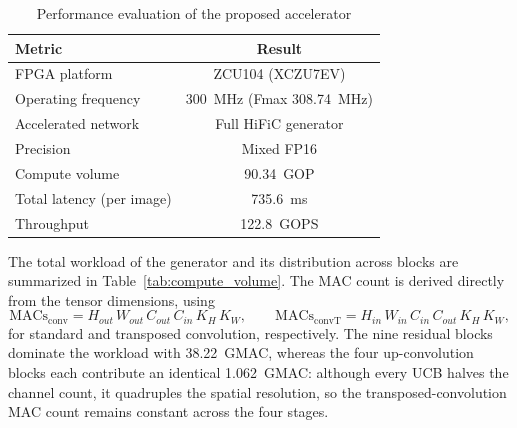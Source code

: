 \begin{table}[H]
    \centering
    \caption{Performance evaluation of the proposed accelerator}
    \label{tab:performance_evaluation}
    \begin{tabular}{|l|c|}
        \hline
        \textbf{Metric} & \textbf{Result} \\
        \hline
        FPGA platform & ZCU104 (XCZU7EV) \\
        \hline
        Operating frequency & 300~MHz (Fmax 308.74~MHz) \\
        \hline
        Accelerated network & Full HiFiC generator \\
        \hline
        Precision & Mixed FP16 \\
        \hline
        Compute volume & 90.34~GOP \\
        \hline
        Total latency (per image) & 735.6~ms \\
        \hline
        Throughput & 122.8~GOPS \\
        \hline
    \end{tabular}
\end{table}

The total workload of the generator and its distribution across blocks are summarized in Table~\ref{tab:compute_volume}. The MAC count is derived directly from the tensor dimensions, using
\[
\text{MACs}_{\text{conv}} = H_{out}\,W_{out}\,C_{out}\,C_{in}\,K_H\,K_W,
\qquad
\text{MACs}_{\text{convT}} = H_{in}\,W_{in}\,C_{in}\,C_{out}\,K_H\,K_W,
\]
for standard and transposed convolution, respectively. The nine residual blocks dominate the workload with 38.22~GMAC, whereas the four up-convolution blocks each contribute an identical 1.062~GMAC: although every UCB halves the channel count, it quadruples the spatial resolution, so the transposed-convolution MAC count remains constant across the four stages.

